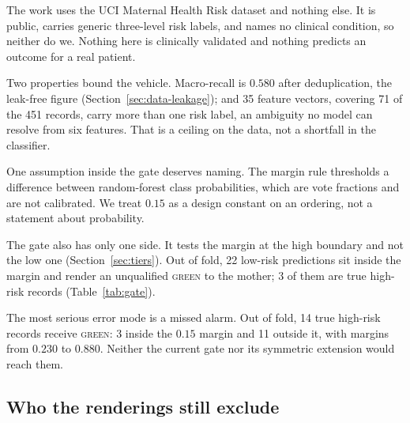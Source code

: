 The work uses the UCI Maternal Health Risk dataset and nothing else. It is
public, carries generic three-level risk labels, and names no clinical
condition, so neither do we. Nothing here is clinically validated and nothing
predicts an outcome for a real patient.

Two properties bound the vehicle. Macro-recall is $0.580$ after
deduplication, the leak-free figure (Section~\ref{sec:data-leakage}); and 35
feature vectors, covering 71 of the 451 records, carry more than one risk
label, an ambiguity no model can resolve from six features. That is a ceiling
on the data, not a shortfall in the classifier.


One assumption inside the gate deserves naming. The margin rule thresholds a
difference between random-forest class probabilities, which are vote
fractions and are not calibrated. We treat $0.15$ as a design
constant on an ordering, not a statement about probability.

The gate also has only one side. It tests the margin at the high boundary and
not the low one (Section~\ref{sec:tiers}). Out of fold, 22 low-risk
predictions sit inside the margin and render an unqualified \textsc{green} to
the mother; 3 of them are true high-risk records (Table~\ref{tab:gate}).

The most serious error mode is a missed alarm. Out of fold, 14 true high-risk
records receive \textsc{green}: 3 inside the $0.15$ margin and 11 outside it,
with margins from $0.230$ to $0.880$. Neither the current gate nor its
symmetric extension would reach them.


\subsection{Who the renderings still exclude}
\label{sec:excl}

